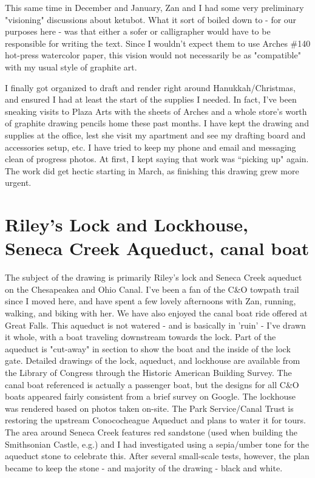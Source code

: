 ﻿\documentclass[letterpaper, 12pt, landscape]{ProgressBook}
\begin{document}
This same time in December and January, Zan and I had some very
preliminary "visioning" discussions about ketubot. What it sort of
boiled down to - for our purposes here - was that either a sofer or
calligrapher would have to be responsible for writing the text. Since I
wouldn’t expect them to use Arches \#140 hot-press watercolor paper, this vision
would not necessarily be as "compatible" with my usual style of
graphite art.

I finally got organized to draft and render right around
Hanukkah/Christmas, and ensured I had at least the start of the supplies I
needed. In fact, I’ve been sneaking visits to Plaza Arts with the sheets of
Arches and a whole store’s worth of graphite drawing pencils home these past
months. I have kept the drawing and supplies at the office, lest she visit my
apartment and see my drafting board and accessories setup, etc.
I have tried to keep my phone and email and messaging clean of
progress photos. At first, I kept saying that work was “picking up" again.
The work did get hectic starting in March, as finishing this drawing grew more
urgent.

\section*{Riley’s Lock and Lockhouse, Seneca Creek Aqueduct, canal boat}

The subject of the drawing is primarily Riley's lock and Seneca
Creek aqueduct on the Chesapeakea and Ohio Canal. I've been a fan of the
C\&O towpath trail since I moved here, and have spent a few lovely
afternoons with Zan, running, walking, and biking with her. We have also
enjoyed the canal boat ride offered at Great Falls.
This aqueduct is not watered - and is basically in 'ruin' - I've
drawn it whole, with a boat traveling downstream towards the lock. Part of the
aqueduct is "cut-away" in section to show the boat and the inside of
the lock gate. Detailed drawings of the lock, aqueduct, and lockhouse are
available from the Library of Congress through the Historic American Building
Survey. The canal boat referenced is actually a passenger boat, but the designs
for all C\&O boats appeared fairly consistent from a brief survey on Google.
The lockhouse was rendered based on photos taken on-site.
The Park Service/Canal Trust is restoring the upstream
Conococheague Aqueduct and plans to water it for tours. The area around Seneca
Creek features red sandstone (used when building the Smithsonian Castle, e.g.)
and I had investigated using a sepia/umber tone for the aqueduct stone to
celebrate this. After several small-scale tests, however, the plan became to
keep the stone - and majority of the drawing - black and white.
\end{document}
